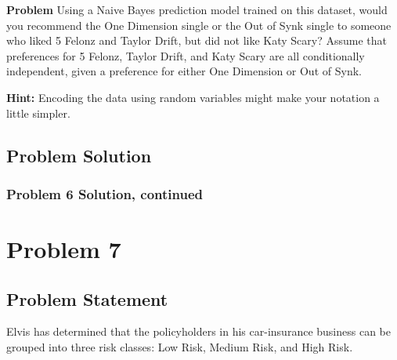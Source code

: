 \documentclass[12pt]{article}
\theoremstyle{definition}
\begin{document}
\noindent
{\bf Problem} Using a Naive Bayes prediction model trained on this dataset, would you recommend the One Dimension single or the Out of Synk single to someone who liked 5 Felonz and Taylor Drift, but did not like Katy Scary? Assume that preferences for 5 Felonz, Taylor Drift, and Katy Scary are all conditionally independent, given a preference for either One Dimension or Out of Synk.

\bigskip
\noindent
{\bf Hint:} Encoding the data using random variables might make your notation a little simpler.

\newpage
\subsection*{Problem Solution}


\newpage
\subsubsection*{Problem 6 Solution, continued}



\newpage
\section*{Problem 7}


\subsection*{Problem Statement}

Elvis has determined that the policyholders in his car-insurance business can be grouped into three risk classes: Low Risk, Medium Risk, and High Risk.
\end{document}
